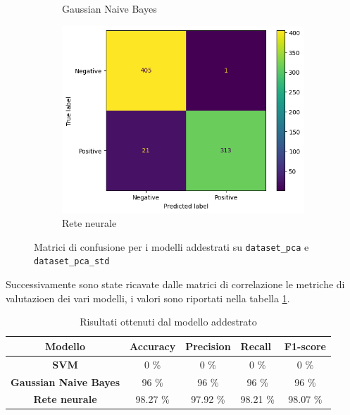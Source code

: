 \begin{figure}[!ht]
\begin{subfigure}{.45\textwidth}
        \caption{Gaussian Naive Bayes}
        \label{fig:matrice_di_confusione_per_GNB_pca}
    \end{subfigure}
    \hfill
    \begin{subfigure}{.45\textwidth}
        \centering
        \includegraphics[width=\textwidth]{img/rete/matrice_confusione_PCA.png}
        \caption{Rete neurale}
        \label{fig:matrice_di_confusione_per_NN_pca}
    \end{subfigure}
    \caption{Matrici di confusione per i modelli addestrati su \texttt{dataset\_pca} e \texttt{dataset\_pca\_std}}
    \label{fig:matrice_di_confusione_per_pca}
\end{figure}

Successivamente sono state ricavate dalle matrici di correlazione le metriche 
di valutazioen dei vari modelli, i valori sono riportati nella tabella 
\ref{tab:risultati_pca}.

\begin{table}[!ht]
    \centering
    \begin{tabular}{@{}cllll@{}}
        \toprule
        \rowcolor[HTML]{EFEFEF}
        \textbf{Modello}                                      & \textbf{Accuracy}         & \textbf{Precision}          & \textbf{Recall}            & \textbf{F1-score}            \\ \midrule
        \cellcolor[HTML]{EFEFEF}\textbf{SVM}                  & \multicolumn{1}{c}{0 \%}     & \multicolumn{1}{c}{0 \%}     & \multicolumn{1}{c}{0 \%}     & \multicolumn{1}{c}{0 \%}     \\
        \cellcolor[HTML]{EFEFEF}\textbf{Gaussian Naive Bayes} & \multicolumn{1}{c}{96 \%}    & \multicolumn{1}{c}{96 \%}    & \multicolumn{1}{c}{96 \%}    & \multicolumn{1}{c}{96 \%}    \\
        \cellcolor[HTML]{EFEFEF}\textbf{Rete neurale}         & \multicolumn{1}{c}{98.27 \%} & \multicolumn{1}{c}{97.92 \%} & \multicolumn{1}{c}{98.21 \%} & \multicolumn{1}{c}{98.07 \%} \\ \bottomrule
    \end{tabular}
    \caption{Risultati ottenuti dal modello addestrato}
    \label{tab:risultati_pca}
\end{table}

